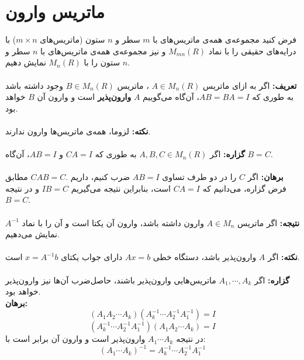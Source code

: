 \section{ماتریس وارون}
فرض کنید مجموعه‌ی همه‌ی ماتریس‌های با $m$ سطر و $n$ ستون (ماتریس‌های $m\times n$) با درایه‌های حقیقی را با نماد $M_{mn}(R)$ و نیز مجموعه‌ی همه‌ی ماتریس‌های با $n$ سطر و $n$ ستون را با $M_{n}(R)$ نمایش دهیم.\\\\
\textbf{تعریف:}
اگر به ازای ماتریس $A\in M_{n}(R)$ ، ماتریس $B\in M_{n}(R)$ وجود داشته باشد به طوری که $AB = BA = I$، آن‌گاه می‌گوییم $A$ \textbf{وارون‌پذیر} است و وارون آن $B$ خواهد بود.\\\\
\textbf{نکته:}
لزوما، همه‌ی ماتریس‌ها وارون ندارند.\\\\
\textbf{گزاره:}
اگر $A,B,C\in M_{n}(R)$ به طوری که $CA=I $ و $ AB=I$، آن‌گاه $B=C$.\\\\
\textbf{برهان:} اگر $C$ را در دو طرف تساوی $AB = I$ ضرب کنیم، داریم .$CAB=C$ مطابق فرض گزاره، می‌دانیم که $CA=I$ است، بنابراین نتیجه می‌گیریم $IB=C$ و در نتیجه $B=C$.\\\\
\textbf{نتیجه:}
اگر ماتریس  $A\in M_{n}$ وارون داشته باشد، وارون آن یکتا است و آن را با نماد $A^{-1}$ نمایش می‌دهیم.\\\\
\textbf{نکته:}
اگر $A$ وارون‌پذیر باشد، دستگاه خطی $Ax=b$ دارای جواب یکتای $x=A^{-1}b$ ‌است.\\\\
\textbf{گزاره:}
اگر $A_{1},\cdots,A_{k}$ ماتریس‌هایی وارون‌پذیر باشند، حاصل‌ضرب آن‌ها نیز وارون‌پذیر خواهد بود.\\
\textbf{برهان:}
$$(A_{1}A_{2}\cdots A_{k})(A_{k}^{-1}\cdots A_{2}^{-1}A_{1}^{-1}) = I$$
$$(A_{k}^{-1}\cdots A_{2}^{-1}A_{1}^{-1})(A_{1}A_{2}\cdots A_{k}) = I$$
در نتیجه $A_{1}\cdots A_{k}$ وارون‌پذیر است و وارون آن برابر است با:
$$(A_{1}\cdots A_{k})^{-1} = A_{k}^{-1}\cdots A_{2}^{-1}A_{1}^{-1}$$ 

